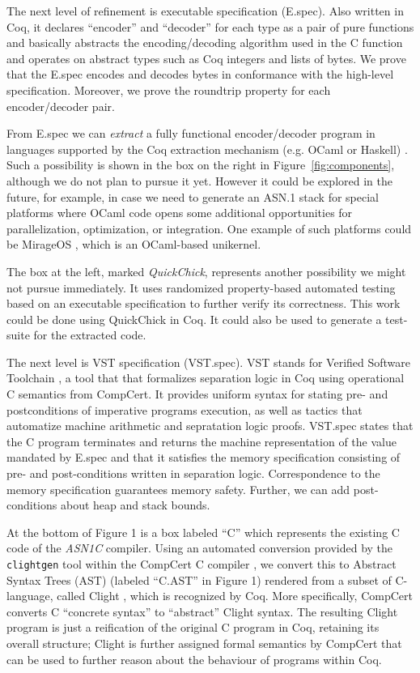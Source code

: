 \documentclass[10p,conference]{IEEEtran}
\begin{document}
The next level of refinement is executable specification (E.spec). Also
written in Coq, it declares ``encoder'' and ``decoder'' for each type
as a pair of pure functions and basically abstracts the encoding/decoding algorithm used in the C function and operates on abstract types such as Coq integers and lists of bytes. We prove that the E.spec encodes and decodes bytes in conformance with the high-level
specification. Moreover, we prove the roundtrip property for each encoder/decoder pair.

From E.spec we can \textit{extract} a fully functional encoder/decoder program in
languages supported by the Coq extraction mechanism (e.g. OCaml or
Haskell) \cite{Extraction}. Such a possibility is shown in the box
on the right in Figure~\ref{fig:components}, although we do not plan to
pursue it yet. However it could be explored in the future, for example,
in case we need to generate an ASN.1 stack for special platforms where
OCaml code opens some additional opportunities for parallelization,
optimization, or integration. One example of such platforms could be
MirageOS \cite{MirageOS}, which is an OCaml-based unikernel.

The box at the left, marked \textit{QuickChick}, represents another
possibility we might not pursue immediately. It uses randomized
property-based automated testing based on an executable
specification to further verify its correctness. This work could be
done using QuickChick \cite{QuickChick} in Coq. It could also be used
to generate a test-suite for the extracted code.

The next level is VST specification (VST.spec). VST stands for Verified Software Toolchain \cite{VST}, a tool that that formalizes separation logic in Coq using operational C semantics from CompCert. It provides uniform syntax for stating pre- and postconditions of imperative programs execution, as well as tactics that automatize machine arithmetic and sepratation logic proofs. VST.spec states that the C program terminates and returns the machine representation of the value mandated by E.spec and that it satisfies the memory specification consisting of pre- and post-conditions written in separation logic. Correspondence to the memory specification guarantees memory safety. Further, we can add post-conditions about heap and stack bounds. 

At the bottom of Figure 1 is a box labeled ``C'' which represents the
existing C code of the \emph{ASN1C} compiler. Using an automated conversion
provided by the \texttt{clightgen} tool within the CompCert C compiler
\cite{CompCert}, we convert this to Abstract Syntax Trees (AST) (labeled ``C.AST'' in Figure 1) rendered from a subset
of C-language, called Clight \cite{Mechanized}, which is recognized by Coq. More specifically,
CompCert converts C ``concrete syntax'' to ``abstract'' Clight
syntax. The resulting Clight program is just a reification of the
original C program in Coq, retaining its overall structure; Clight is further assigned formal semantics
by CompCert that can be used to further reason about the behaviour of programs within Coq. 
\end{document}
